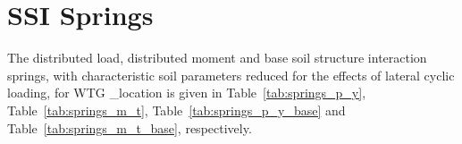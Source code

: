 \chapter{SSI Springs}\label{sec_9}




The distributed load, distributed moment and base soil structure interaction springs, with characteristic soil parameters reduced for the effects of lateral cyclic loading, for WTG \ID_location is given in Table~\ref{tab:springs_p_y}, Table~\ref{tab:springs_m_t}, Table~\ref{tab:springs_p_y_base} and Table~\ref{tab:springs_m_t_base}, respectively.


